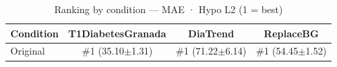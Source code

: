 \begin{table}[htbp]
\centering
\small
\caption{Ranking by condition — MAE · Hypo L2  (1 = best)}
\label{tab:ranking_mae_tbr_2_family_size_baseline}
\begin{tabular}{lccc}
\toprule
\textbf{Condition} & \textbf{T1DiabetesGranada} & \textbf{DiaTrend} & \textbf{ReplaceBG} \\
\midrule
Original & \#1 (35.10$\pm$1.31) & \#1 (71.22$\pm$6.14) & \#1 (54.45$\pm$1.52) \\
\bottomrule
\end{tabular}
\end{table}